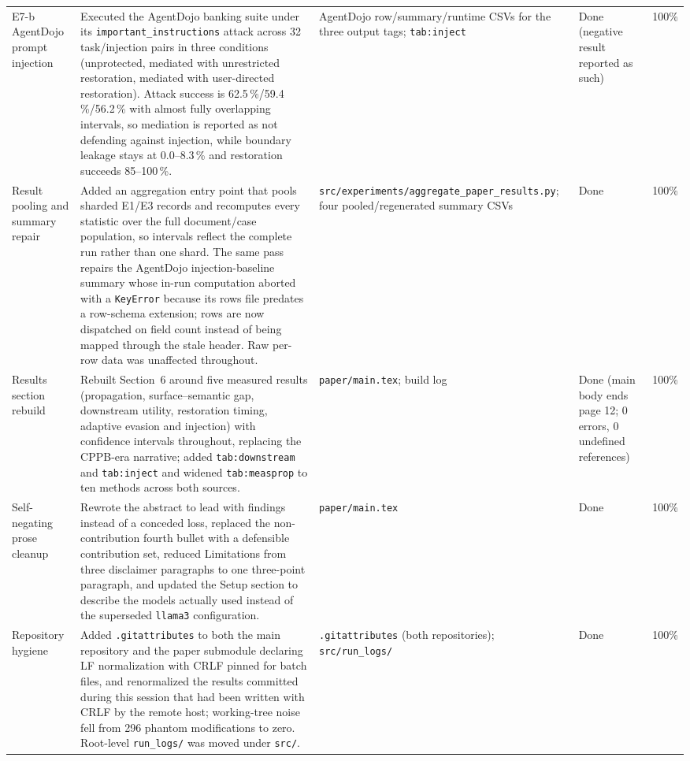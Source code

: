 \documentclass[11pt]{article}
\begin{document}
\begin{longtable}{p{}p{}p{}p{}p{}}
E7-b AgentDojo prompt injection & Executed the AgentDojo banking suite under its \texttt{important\_instructions} attack across 32 task/injection pairs in three conditions (unprotected, mediated with unrestricted restoration, mediated with user-directed restoration). Attack success is 62.5\,\%/59.4\,\%/56.2\,\% with almost fully overlapping intervals, so mediation is reported as not defending against injection, while boundary leakage stays at 0.0--8.3\,\% and restoration succeeds 85--100\,\%. & AgentDojo row/summary/runtime CSVs for the three output tags; \texttt{tab:inject} & Done (negative result reported as such) & 100\% \\
Result pooling and summary repair & Added an aggregation entry point that pools sharded E1/E3 records and recomputes every statistic over the full document/case population, so intervals reflect the complete run rather than one shard. The same pass repairs the AgentDojo injection-baseline summary whose in-run computation aborted with a \texttt{KeyError} because its rows file predates a row-schema extension; rows are now dispatched on field count instead of being mapped through the stale header. Raw per-row data was unaffected throughout. & \texttt{src/experiments/aggregate\_paper\_results.py}; four pooled/regenerated summary CSVs & Done & 100\% \\
Results section rebuild & Rebuilt Section~6 around five measured results (propagation, surface--semantic gap, downstream utility, restoration timing, adaptive evasion and injection) with confidence intervals throughout, replacing the CPPB-era narrative; added \texttt{tab:downstream} and \texttt{tab:inject} and widened \texttt{tab:measprop} to ten methods across both sources. & \texttt{paper/main.tex}; build log & Done (main body ends page 12; 0 errors, 0 undefined references) & 100\% \\
Self-negating prose cleanup & Rewrote the abstract to lead with findings instead of a conceded loss, replaced the non-contribution fourth bullet with a defensible contribution set, reduced Limitations from three disclaimer paragraphs to one three-point paragraph, and updated the Setup section to describe the models actually used instead of the superseded \texttt{llama3} configuration. & \texttt{paper/main.tex} & Done & 100\% \\
Repository hygiene & Added \texttt{.gitattributes} to both the main repository and the paper submodule declaring LF normalization with CRLF pinned for batch files, and renormalized the results committed during this session that had been written with CRLF by the remote host; working-tree noise fell from 296 phantom modifications to zero. Root-level \texttt{run\_logs/} was moved under \texttt{src/}. & \texttt{.gitattributes} (both repositories); \texttt{src/run\_logs/} & Done & 100\% \\

\end{longtable}
\end{document}
